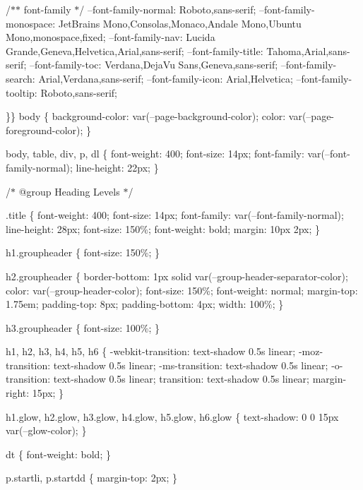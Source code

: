 /\texorpdfstring{$\ast$}{*}\texorpdfstring{$\ast$}{*} font-\/family \texorpdfstring{$\ast$}{*}/ --font-\/family-\/normal\+: Roboto,sans-\/serif; --font-\/family-\/monospace\+: \textquotesingle{}Jet\+Brains Mono\textquotesingle{},Consolas,Monaco,\textquotesingle{}Andale Mono\textquotesingle{},\textquotesingle{}Ubuntu Mono\textquotesingle{},monospace,fixed; --font-\/family-\/nav\+: \textquotesingle{}Lucida Grande\textquotesingle{},Geneva,Helvetica,Arial,sans-\/serif; --font-\/family-\/title\+: Tahoma,Arial,sans-\/serif; --font-\/family-\/toc\+: Verdana,\textquotesingle{}Deja\+Vu Sans\textquotesingle{},Geneva,sans-\/serif; --font-\/family-\/search\+: Arial,Verdana,sans-\/serif; --font-\/family-\/icon\+: Arial,Helvetica; --font-\/family-\/tooltip\+: Roboto,sans-\/serif;

\}\} body \{ background-\/color\+: var(--page-\/background-\/color); color\+: var(--page-\/foreground-\/color); \}

body, table, div, p, dl \{ font-\/weight\+: 400; font-\/size\+: 14px; font-\/family\+: var(--font-\/family-\/normal); line-\/height\+: 22px; \}

/\texorpdfstring{$\ast$}{*} @group Heading Levels \texorpdfstring{$\ast$}{*}/

.title \{ font-\/weight\+: 400; font-\/size\+: 14px; font-\/family\+: var(--font-\/family-\/normal); line-\/height\+: 28px; font-\/size\+: 150\%; font-\/weight\+: bold; margin\+: 10px 2px; \}

h1.\+groupheader \{ font-\/size\+: 150\%; \}

h2.\+groupheader \{ border-\/bottom\+: 1px solid var(--group-\/header-\/separator-\/color); color\+: var(--group-\/header-\/color); font-\/size\+: 150\%; font-\/weight\+: normal; margin-\/top\+: 1.\+75em; padding-\/top\+: 8px; padding-\/bottom\+: 4px; width\+: 100\%; \}

h3.\+groupheader \{ font-\/size\+: 100\%; \}

h1, h2, h3, h4, h5, h6 \{ -\/webkit-\/transition\+: text-\/shadow 0.\+5s linear; -\/moz-\/transition\+: text-\/shadow 0.\+5s linear; -\/ms-\/transition\+: text-\/shadow 0.\+5s linear; -\/o-\/transition\+: text-\/shadow 0.\+5s linear; transition\+: text-\/shadow 0.\+5s linear; margin-\/right\+: 15px; \}

h1.\+glow, h2.\+glow, h3.\+glow, h4.\+glow, h5.\+glow, h6.\+glow \{ text-\/shadow\+: 0 0 15px var(--glow-\/color); \}

dt \{ font-\/weight\+: bold; \}

p.\+startli, p.\+startdd \{ margin-\/top\+: 2px; \}

